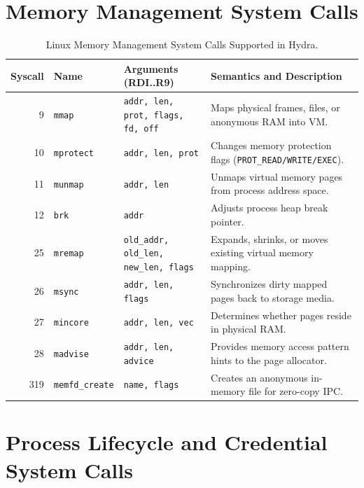 \section{Memory Management System Calls}
\label{sec:ref_mem_ops}

\begin{table}[htbp]
\centering
\small
\begin{tabularx}{\textwidth}{rllX}
\toprule
\textbf{Syscall} & \textbf{Name} & \textbf{Arguments (RDI..R9)} & \textbf{Semantics and Description} \\
\midrule
9 & \texttt{mmap} & \texttt{addr, len, prot, flags, fd, off} & Maps physical frames, files, or anonymous RAM into VM. \\
10 & \texttt{mprotect} & \texttt{addr, len, prot} & Changes memory protection flags (\texttt{PROT\_READ/WRITE/EXEC}). \\
11 & \texttt{munmap} & \texttt{addr, len} & Unmaps virtual memory pages from process address space. \\
12 & \texttt{brk} & \texttt{addr} & Adjusts process heap break pointer. \\
25 & \texttt{mremap} & \texttt{old\_addr, old\_len, new\_len, flags} & Expands, shrinks, or moves existing virtual memory mapping. \\
26 & \texttt{msync} & \texttt{addr, len, flags} & Synchronizes dirty mapped pages back to storage media. \\
27 & \texttt{mincore} & \texttt{addr, len, vec} & Determines whether pages reside in physical RAM. \\
28 & \texttt{madvise} & \texttt{addr, len, advice} & Provides memory access pattern hints to the page allocator. \\
319 & \texttt{memfd\_create} & \texttt{name, flags} & Creates an anonymous in-memory file for zero-copy IPC. \\
\bottomrule
\end{tabularx}
\caption{Linux Memory Management System Calls Supported in Hydra.}
\label{tab:syscall_mem}
\end{table}

\section{Process Lifecycle and Credential System Calls}
\label{sec:ref_proc_ops}

